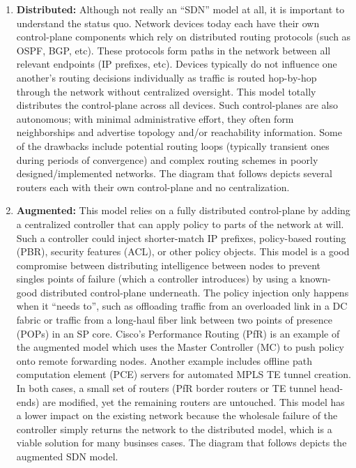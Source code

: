 \begin{enumerate}
  \item \textbf{Distributed:} Although not really an ``SDN'' model at all, it
  is important to understand the status quo. Network devices today each have
  their own control-plane components which rely on distributed routing
  protocols (such as OSPF, BGP, etc). These protocols form paths in the
  network between all relevant endpoints (IP prefixes, etc). Devices typically
  do not influence one another’s routing decisions individually as traffic is
  routed hop-by-hop through the network without centralized oversight. This
  model totally distributes the control-plane across all devices. Such
  control-planes are also autonomous; with minimal administrative effort, they
  often form neighborships and advertise topology and/or reachability
  information. Some of the drawbacks include potential routing loops
  (typically transient ones during periods of convergence) and complex routing
  schemes in poorly designed/implemented networks. The diagram that follows depicts
  several routers each with their own control-plane and no centralization.


  \item \textbf{Augmented:} This model relies on a fully distributed
  control-plane by adding a centralized controller that can apply policy to
  parts of the network at will. Such a controller could inject shorter-match
  IP prefixes, policy-based routing (PBR), security features (ACL), or other
  policy objects. This model is a good compromise between distributing
  intelligence between nodes to prevent singles points of failure (which a
  controller introduces) by using a known-good distributed control-plane
  underneath. The policy injection only happens when it ``needs to'', such as
  offloading traffic from an overloaded link in a DC fabric or traffic from a
  long-haul fiber link between two points of presence (POPs) in an SP core.
  Cisco’s Performance Routing (PfR) is an example of the augmented model which
  uses the Master Controller (MC) to push policy onto remote forwarding nodes.
  Another example includes offline path computation element (PCE) servers for
  automated MPLS TE tunnel creation. In both cases, a small set of routers
  (PfR border routers or TE tunnel head-ends) are modified, yet the remaining
  routers are untouched. This model has a lower impact on the existing network
  because the wholesale failure of the controller simply returns the network
  to the distributed model, which is a viable solution for many businses
  cases. The diagram that follows depicts the augmented SDN model.


\end{enumerate}
